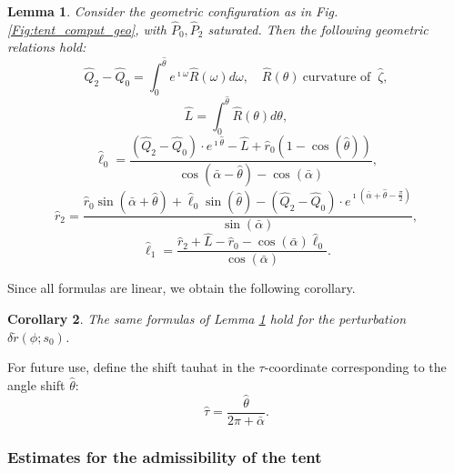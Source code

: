 \documentclass[reqno]{amsart}
\theoremstyle{definition} \newtheorem{definition}{Definition}[section]
\theoremstyle{definition} \newtheorem{remark}[definition]{Remark}
\theoremstyle{plain} \newtheorem{lemma}[definition]{Lemma}
\theoremstyle{plain} \newtheorem{proposition}[definition]{Proposition}
\theoremstyle{plain} \newtheorem{theorem}[definition]{Theorem}
\theoremstyle{plain} \newtheorem{corollary}[definition]{Corollary}
\theoremstyle{definition} \newtheorem{example}[definition]{Example}
\theoremstyle{plain} \newtheorem{claim}[clai]{Claim}
\theoremstyle{definition} \newtheorem{assumption}[definition]{Assumption}
\theoremstyle{definition} \newtheorem{observation}[definition]{Observation}
\newcommand{\1}{\mathbbm 1}
\renewcommand{\i}{\imath}
\numberwithin{equation}{section} %
\theoremstyle{plain} \newtheorem*{theorem*}{Theorem}
\theoremstyle{plain} \newtheorem{mthm}[maintheorem]{Main Theorem}
\theoremstyle{plain} \newtheorem*{mthm*}{Main Theorem}
\theoremstyle{plain} \newtheorem*{conjecture*}{Conjecture}
\theoremstyle{plain} \newtheorem{conjecture}[definition]{Conjecture}
\theoremstyle{plain} \newtheorem*{problem*}{Problem}
\begin{document}
\begin{lemma}
\label{Lem:relation_admissibility_tent}
Consider the geometric configuration as in Fig. \ref{Fig:tent_comput_geo}, with $\hat P_0,\hat P_2$ saturated. Then the following geometric relations hold:
\begin{equation*}
\hat Q_2 - \hat Q_0 = \int_0^{\hat \theta} e^{\i \omega} \hat R(\omega) d\omega, \quad \hat R(\theta) \ \text{curvature of } \ \hat \zeta,
\end{equation*}
\begin{equation*}
\hat L = \int_0^{\hat \theta} \hat R(\theta) d\theta,
\end{equation*}
\begin{equation}
\label{Equa:ell_0_tent_general}
\hat \ell_0 = \frac{(\hat Q_2 - \hat Q_0) \cdot e^{\i \hat \theta} - \hat L + \hat r_0 (1 - \cos(\hat \theta))}{\cos(\bar \alpha - \hat \theta) - \cos(\bar \alpha)},
\end{equation}
\begin{equation*}
\hat r_2 = \frac{\hat r_0 \sin(\bar \alpha + \hat \theta) + \hat \ell_0 \sin(\hat \theta) - (\hat Q_2 - \hat Q_0) \cdot e^{\i (\bar \alpha + \hat \theta - \frac{\pi}{2})}}{\sin(\bar \alpha)},
\end{equation*}
\begin{equation*}
\hat \ell_1 = \frac{\hat r_2 + \hat L -\hat r_0 - \cos(\bar \alpha) \hat \ell_0}{\cos(\bar \alpha)}.
\end{equation*}
\end{lemma}

Since all formulas are linear, we obtain the following corollary.

\begin{corollary}
\label{Cor:tent_corol_for_pert}
The same formulas of Lemma \ref{Lem:relation_admissibility_tent} hold for the perturbation $\delta \check r(\phi;s_0)$.
\end{corollary}

For future use, define the shift \gls{tauhat} in the $\tau$-coordinate corresponding to the angle shift $\hat \theta$:
\begin{equation}
\label{Equa:hattau_def}
\hat \tau = \frac{\hat \theta}{2\pi + \bar \alpha}.
\end{equation}

\subsubsection{Estimates for the admissibility of the tent}
\label{Sss:having_tent_check}
\end{document}

